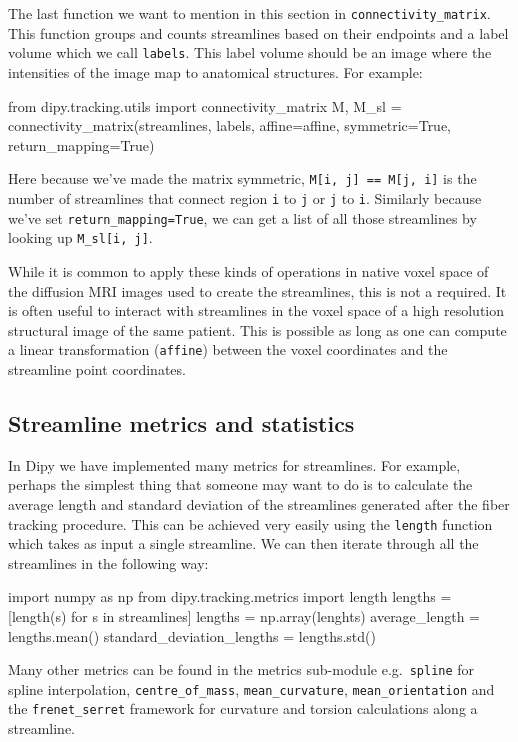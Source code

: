 \documentclass{bioinfo}
\begin{document}
The last function we want to mention in this section in
\texttt{connectivity\_matrix}. This function groups and counts streamlines
based on their endpoints and a label volume which we call \texttt{labels}. This
label volume should be an image where the intensities of the image map to
anatomical structures. For example:
\begin{python}
from dipy.tracking.utils import
                              connectivity_matrix
M, M_sl = connectivity_matrix(streamlines, labels,
                              affine=affine,
                              symmetric=True,
                              return_mapping=True)
\end{python}

Here because we've made the matrix symmetric, \texttt{M[i, j] == M[j, i]} is the number of streamlines that connect region \texttt{i} to \texttt{j}
or \texttt{j} to \texttt{i}. Similarly because we've set
\texttt{return\_mapping=True}, we can get a list of all those streamlines by
looking up \texttt{M\_sl[i, j]}.

While it is common to apply these kinds of operations in native voxel space of
the diffusion MRI images used to create the streamlines, this is not a
required. It is often useful to interact with streamlines in the voxel space of
a high resolution structural image of the same patient. This is possible as
long as one can compute a linear transformation (\texttt{affine}) between the voxel coordinates and the streamline point coordinates.

\subsection{Streamline metrics and statistics}

In Dipy we have implemented many metrics for streamlines. For example,
perhaps the simplest thing that someone may want to do is to calculate the
average length and standard deviation of the streamlines generated after the
fiber tracking procedure. This can be achieved very easily using the \texttt{length}
function which takes as input a single streamline. We can then iterate through
all the streamlines in the following way:
\begin{python}
import numpy as np
from dipy.tracking.metrics import length
lengths = [length(s) for s in streamlines]
lengths = np.array(lenghts)
average_length = lengths.mean()
standard_deviation_lengths = lengths.std()
\end{python}
Many other metrics can be found in the metrics sub-module e.g.~\texttt{spline} for
spline interpolation, \texttt{centre\_of\_mass}, \texttt{mean\_curvature},
\texttt{mean\_orientation} and the \texttt{frenet\_serret} framework for curvature
and torsion calculations along a streamline.
\end{document}
